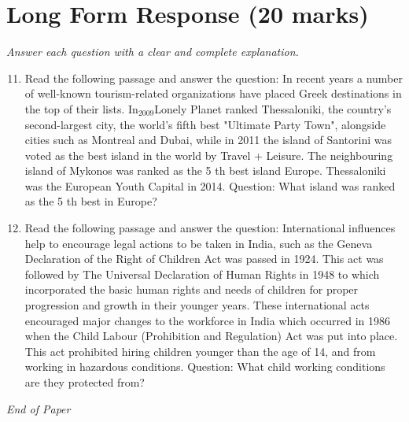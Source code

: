 \documentclass[12pt]{article}
\begin{document}
\section*{Long Form Response (20 marks)}
\textit{Answer each question with a clear and complete explanation.}
\begin{enumerate}[label=\arabic*.]
\setcounter{enumi}{10}
\item Read the following passage and answer the question: In recent years a number of well-known tourism-related organizations have placed Greek destinations in the top of their lists. In$_{2009}$Lonely Planet ranked Thessaloniki, the country's second-largest city, the world's fifth best "Ultimate Party Town", alongside cities such as Montreal and Dubai, while in 2011 the island of Santorini was voted as the best island in the world by Travel + Leisure. The neighbouring island of Mykonos was ranked as the 5 th best island Europe. Thessaloniki was the European Youth Capital in 2014. Question: What island was ranked as the 5 th best in Europe?
\item Read the following passage and answer the question: International influences help to encourage legal actions to be taken in India, such as the Geneva Declaration of the Right of Children Act was passed in 1924. This act was followed by The Universal Declaration of Human Rights in 1948 to which incorporated the basic human rights and needs of children for proper progression and growth in their younger years. These international acts encouraged major changes to the workforce in India which occurred in 1986 when the Child Labour (Prohibition and Regulation) Act was put into place. This act prohibited hiring children younger than the age of 14, and from working in hazardous conditions. Question: What child working conditions are they protected from?
\end{enumerate}

\vfill
\noindent\textit{End of Paper}
\end{document}

